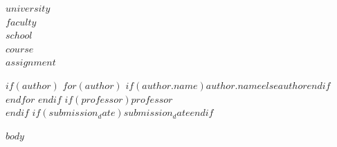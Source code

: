 \documentclass[$if(fontsize)$$fontsize$$else$12pt$endif$,$if(lang)$$lang$$else$spanish$endif$]{$if(documentclass)$$documentclass$$else$article$endif$}
\begin{document}
\begin{center}
    {\bfseries \Large $university$}\\[0.3cm]
    {\bfseries \large $faculty$}\\[0.2cm]
    {\bfseries $school$}\\[1.5cm]
    
    {\bfseries \large $course$}\\[1cm]
    
    {\bfseries \Large $assignment$}\\[1.5cm]
\end{center}

\begin{center}
    $if(author)$
        $for(author)$
            $if(author.name)$$author.name$$else$$author$$endif$ \\
        $endfor$
    $endif$
    \vspace{0.5cm}
    $if(professor)$$professor$ \\ $endif$
    $if(submission_date)$$submission_date$$endif$
\end{center}

\vspace{1cm}

\onehalfspacing
\setlength{\parindent}{1.27cm}

$body$
\end{document}
